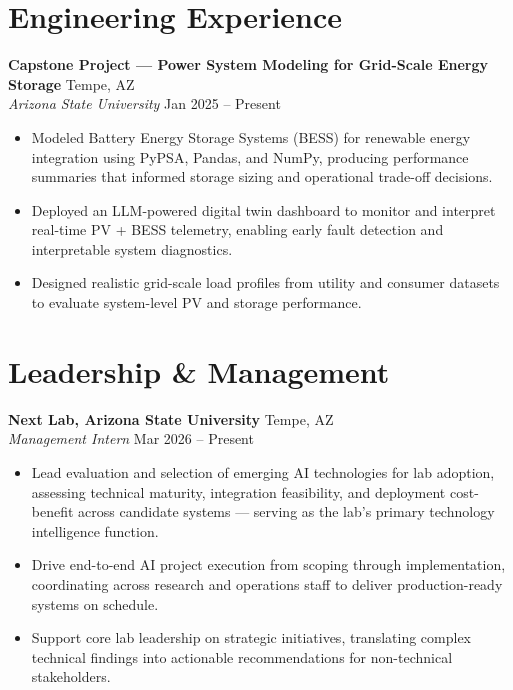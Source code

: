 \documentclass[10pt, letterpaper]{article}
\newcommand{\role}[2]{%
  \textit{#1} \hfill #2 \\[-2pt]%
}
\begin{document}
\section*{Engineering Experience}

\textbf{Capstone Project --- Power System Modeling for Grid-Scale Energy Storage} \hfill Tempe, AZ \\
\role{Arizona State University}{Jan 2025 -- Present}
\begin{itemize}
  \item Modeled Battery Energy Storage Systems (BESS) for renewable energy integration using
    PyPSA, Pandas, and NumPy, producing performance summaries that informed storage sizing and
    operational trade-off decisions.
  \item Deployed an LLM-powered digital twin dashboard to monitor and interpret real-time PV +
    BESS telemetry, enabling early fault detection and interpretable system diagnostics.
  \item Designed realistic grid-scale load profiles from utility and consumer datasets to evaluate
    system-level PV and storage performance.
\end{itemize}

\section*{Leadership \& Management}

\textbf{Next Lab, Arizona State University} \hfill Tempe, AZ \\
\role{Management Intern}{Mar 2026 -- Present}
\begin{itemize}
  \item Lead evaluation and selection of emerging AI technologies for lab adoption, assessing
    technical maturity, integration feasibility, and deployment cost-benefit across candidate
    systems --- serving as the lab's primary technology intelligence function.
  \item Drive end-to-end AI project execution from scoping through implementation, coordinating
    across research and operations staff to deliver production-ready systems on schedule.
  \item Support core lab leadership on strategic initiatives, translating complex technical
    findings into actionable recommendations for non-technical stakeholders.
\end{itemize}
\end{document}
